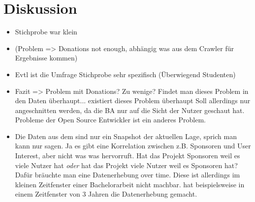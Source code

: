 \chapter{Diskussion}

\begin{itemize}
    \item Stichprobe war klein
    \item (Problem => Donations not enough, abhängig was aus dem Crawler für Ergebnisse kommen)
    \item Evtl ist die Umfrage Stichprobe sehr spezifisch (Überwiegend Studenten)
    \item Fazit => Problem mit Donations? Zu wenige?
          Findet man dieses Problem in den Daten überhaupt... existiert dieses Problem überhaupt
          Soll allerdings nur angeschnitten werden, da die BA nur auf die Sicht der Nutzer geschaut hat.
          Probleme der Open Source Entwickler ist ein anderes Problem.
    \item Die Daten aus dem  sind nur ein Snapshot der aktuellen Lage, sprich man kann
          nur sagen. Ja es gibt eine Korrelation zwischen z.B. Sponsoren und User Interest, aber nicht was was hervorruft.
          Hat das Projekt Sponsoren weil es viele Nutzer hat \textit{oder} hat das Projekt viele Nutzer weil es Sponsoren hat?
          Dafür bräuchte man eine Datenerhebung over time. 
          Diese ist allerdings im kleinen Zeitfenster einer Bachelorarbeit nicht machbar.
          \cite{midhaFactorsAffectingSuccess2012} hat beispielsweise in einem Zeitfenster von 3 Jahren die
          Datenerhebung gemacht. %
\end{itemize}